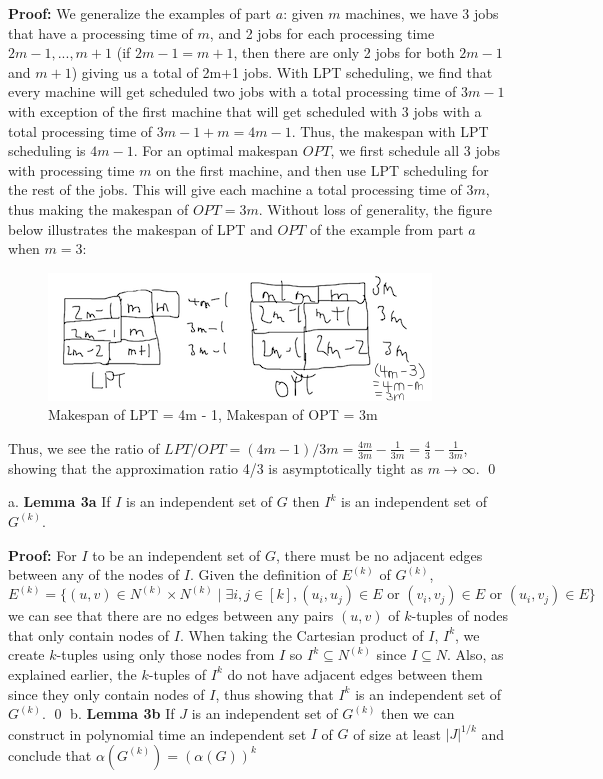 \documentclass[oneside]{homework} %
\begin{document}
\textbf{Proof:} We generalize the examples of part $a$: given $m$ machines, we have 3 jobs that have a processing time of $m$, and 2 jobs for each processing time $2m-1,...,m+1$ (if $2m-1 = m+1$, then there are only 2 jobs for both $2m-1$ and $m+1$) giving us a total of 2m+1 jobs. With LPT scheduling, we find that every machine will get scheduled two jobs with a total processing time of $3m-1$ with exception of the first machine that will get scheduled with 3 jobs with a total processing time of $3m-1+m = 4m-1$. Thus, the makespan with LPT scheduling is $4m-1$. For an optimal makespan $OPT$, we first schedule all 3 jobs with processing time $m$ on the first machine, and then use LPT scheduling for the rest of the jobs. This will give each machine a total processing time of $3m$, thus making the makespan of $OPT = 3m$. Without loss of generality, the figure below illustrates the makespan of LPT and $OPT$ of the example from part $a$ when $m = 3$:
\begin{figure}[h]
\centering
\includegraphics{2d1}
\caption{Makespan of LPT = 4m - 1, Makespan of OPT = 3m}
\end{figure}
\newline
Thus, we see the ratio of $LPT/OPT = (4m - 1) / 3m = \frac{4m}{3m} - \frac{1}{3m} = \frac{4}{3} - \frac{1}{3m}$, showing that the approximation ratio 4/3 is asymptotically tight as $m \rightarrow \infty$. \hfill\qed

{\large a.} \textbf{Lemma 3a} If $I$ is an independent set of $G$ then $I^k$ is an independent set of $G^{(k)}$.
\newline

\textbf{Proof:} For $I$ to be an independent set of $G$, there must be no adjacent edges between any of the nodes of $I$. Given the definition of $E^{(k)}$ of $G^{(k)}$, $$E^{(k)} = \{(u, v) \in N^{(k)} \times N^{(k)} \mid \exists i, j \in [k], (u_i, u_j) \in E \text{ or } (v_i, v_j) \in E \text{ or } (u_i, v_j) \in E\}$$ we can see that there are no edges between any pairs $(u, v)$ of $k$-tuples of nodes that only contain nodes of $I$. When taking the Cartesian product of $I$, $I^k$, we create $k$-tuples using only those nodes from $I$ so $I^k \subseteq N^{(k)}$ since $I \subseteq N$. Also, as explained earlier, the $k$-tuples of $I^k$ do not have adjacent edges between them since they only contain nodes of $I$, thus showing that $I^k$ is an independent set of $G^{(k)}$. \hfill\qed
\newline
\newline
{\large b.} \textbf{Lemma 3b} If $J$ is an independent set of $G^{(k)}$ then we can construct in polynomial time an independent set $I$ of $G$ of size at least $|J|^{1/k}$ and conclude that $\alpha(G^{(k)}) = (\alpha(G))^k$
\newline
\end{document}
